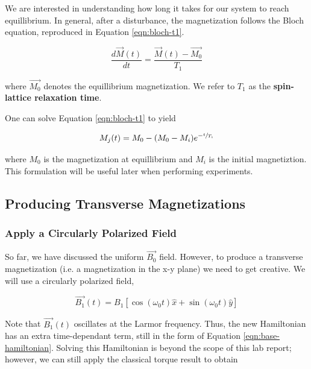 \documentclass[
    floatfix,  %
    reprint,
    amsmath,
    amssymb,
    aps,
]{revtex4-2}
\begin{document}
We are interested in understanding how long it takes for our system to reach equillibrium. In general, after a disturbance, the magnetization follows the Bloch equation, reproduced in Equation \ref{eqn:bloch-t1}.

\begin{equation}\label{eqn:bloch-t1}
    \frac{d \vec{M}(t)}{dt} = \frac{\vec{M}(t)-\vec{M_0}}{T_1}
\end{equation}

where $\vec{M_0}$ denotes the equillibrium magnetization. We refer to $T_1$ as the \textbf{spin-lattice relaxation time}. \cite{principles-resonance}

One can solve Equation \ref{eqn:bloch-t1} to yield

\begin{equation}\label{eqn:decay-eqn}
    M_{j}(t) = M_0 - (M_0 - M_i)e^{-\sfrac{t}{T_1}}
\end{equation}

where $M_0$ is the magnetization at equillibrium and $M_i$ is the initial magnetiztion.\cite{principles-resonance} This formulation will be useful later when performing experiments.











\subsection{\label{sec:tipping}Producing Transverse Magnetizations}



\subsubsection{Apply a Circularly Polarized Field}

So far, we have discussed the uniform $\vec{B_0}$ field. However, to produce a transverse magnetization (i.e. a magnetization in the x-y plane) we need to get creative. We will use a circularly polarized field,

\begin{equation}
    \vec{B_1}(t) = B_1\left[\cos(\omega_0t)\hat{x}+\sin(\omega_0t)\hat{y}\right]
\end{equation}

Note that $\vec{B_1}(t)$ oscillates at the Larmor frequency. Thus, the new Hamiltonian has an extra time-dependant term, still in the form of Equation \ref{eqn:base-hamiltonian}. Solving this Hamiltonian is beyond the scope of this lab report; however, we can still apply the classical torque result to obtain \cite{principles-resonance}
\end{document}
